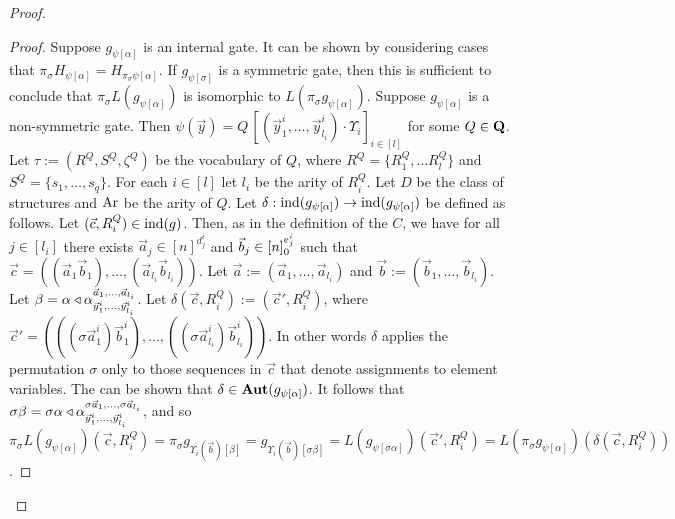 \documentclass[../main/thesis.tex]{subfiles}
\begin{document}
\begin{proof}
\begin{proof}
  Suppose $g_{\psi[\alpha]}$ is an internal gate. It can be shown by considering
  cases that $\pi_\sigma H_{\psi[\alpha]} = H_{\pi_\sigma \psi[\alpha]}$. If
  $g_{\psi[\sigma]}$ is a symmetric gate, then this is sufficient to conclude
  that $\pi_{\sigma} L(g_{\psi [\alpha]})$ is isomorphic to $L(\pi_{\sigma}
  g_{\psi[\alpha]})$. Suppose $g_{\psi[\alpha]}$ is a non-symmetric gate. Then
  $\psi (\vec{y}) = Q \, [(\vec{y}^i_1, \ldots, \vec{y}^i_{l_i}) \cdot
  \Upsilon_i]_{i \in [l]}$ for some $Q \in \mathbf{Q}$. Let $\tau := (R^Q, S^Q,
  \zeta^Q)$ be the vocabulary of $Q$, where $R^{Q} = \{R^{Q}_1, \ldots
  R^{Q}_l\}$ and $S^Q = \{s_1, \ldots, s_q\}$. For each $i \in [l]$ let $l_i$ be
  the arity of $R^{Q}_i$. Let $D$ be the class of structures and $\text{\upshape Ar}$ be the
  arity of $Q$. Let $\delta : \text{\upshape ind}(g_{\psi[\alpha]}) \rightarrow \text{\upshape ind}(g_{\psi[\alpha]})$
  be defined as follows. Let $(\vec{c}, R^Q_i) \in \text{\upshape ind}(g)$. Then, as in the
  definition of the $C$, we have for all $j \in [l_i]$ there exists $\vec{a}_j
  \in [n]^{d^i_j}$ and $\vec{b}_j \in [n]^{e^i_j}_0$ such that $\vec{c} =
  ((\vec{a}_1 \vec{b}_1), \ldots, (\vec{a}_{l_i} \vec{b}_{l_i}))$. Let $\vec{a}
  := (\vec{a}_1, \ldots, \vec{a}_{l_i})$ and $\vec{b} := (\vec{b}_1, \ldots,
  \vec{b}_{l_i})$. Let $\beta = \alpha \triangleleft\alpha^{\vec{a}_1, \ldots,
      \vec{a}_{l_i}}_{\vec{y}^i_1, \ldots, \vec{y}^i_{l_i}}$. Let $\delta
  (\vec{c}, R^Q_i) := (\vec{c}', R^{Q}_i)$, where $\vec{c}' = (((\sigma
  \vec{a}^i_1)\vec{b}^i_1) , \ldots, ((\sigma \vec{a}^i_{l_i})
  \vec{b}^i_{l_i}))$. In other words $\delta$ applies the permutation $\sigma$
  only to those sequences in $\vec{c}$ that denote assignments to element
  variables. The can be shown that $\delta \in \text{\textbf{Aut}}(g_{\psi[\alpha]})$. It
  follows that $\sigma \beta = \sigma \alpha \triangleleft\alpha^{\sigma \vec{a}_1,
      \ldots, \sigma \vec{a}_{l_i}}_{\vec{y}^i_1, \ldots, \vec{y}^i_{l_i}}$,
  and so $\pi_{\sigma} L(g_{\psi[\alpha]})(\vec{c}, R^Q_i) = \pi_{\sigma}
  g_{\Upsilon_i (\vec{b})[\beta]} = g_{\Upsilon_i (\vec{b})[\sigma \beta]} =
  L(g_{\psi[\sigma \alpha]})(\vec{c}', R^Q_i) = L(\pi_\sigma g_{\psi
    [\alpha]})(\delta (\vec{c}, R^Q_i))$.


\end{proof}
\end{proof}
\end{document}
